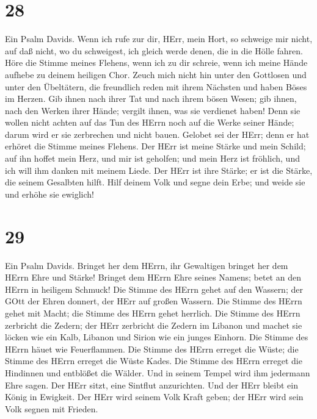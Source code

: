 \hypertarget{section-27}{%
\section{28}\label{section-27}}

 Ein Psalm Davids. Wenn ich rufe zur dir, HErr, mein Hort,
so schweige mir nicht, auf daß nicht, wo du schweigest, ich gleich werde
denen, die in die Hölle fahren.  Höre die Stimme meines
Flehens, wenn ich zu dir schreie, wenn ich meine Hände aufhebe zu deinem
heiligen Chor.  Zeuch mich nicht hin unter den Gottlosen und
unter den Übeltätern, die freundlich reden mit ihrem Nächsten und haben
Böses im Herzen.  Gib ihnen nach ihrer Tat und nach ihrem
bösen Wesen; gib ihnen, nach den Werken ihrer Hände; vergilt ihnen, was
sie verdienet haben!  Denn sie wollen nicht achten auf das
Tun des HErrn noch auf die Werke seiner Hände; darum wird er sie
zerbrechen und nicht bauen.  Gelobet sei der HErr; denn er
hat erhöret die Stimme meines Flehens.  Der HErr ist meine
Stärke und mein Schild; auf ihn hoffet mein Herz, und mir ist geholfen;
und mein Herz ist fröhlich, und ich will ihm danken mit meinem Liede.
 Der HErr ist ihre Stärke; er ist die Stärke, die seinem
Gesalbten hilft.  Hilf deinem Volk und segne dein Erbe; und
weide sie und erhöhe sie ewiglich!

\hypertarget{section-28}{%
\section{29}\label{section-28}}

 Ein Psalm Davids. Bringet her dem HErrn, ihr Gewaltigen
bringet her dem HErrn Ehre und Stärke!  Bringet dem HErrn
Ehre seines Namens; betet an den HErrn in heiligem Schmuck! 
Die Stimme des HErrn gehet auf den Wassern; der GOtt der Ehren donnert,
der HErr auf großen Wassern.  Die Stimme des HErrn gehet mit
Macht; die Stimme des HErrn gehet herrlich.  Die Stimme des
HErrn zerbricht die Zedern; der HErr zerbricht die Zedern im Libanon
 und machet sie löcken wie ein Kalb, Libanon und Sirion wie
ein junges Einhorn.  Die Stimme des HErrn häuet wie
Feuerflammen.  Die Stimme des HErrn erreget die Wüste; die
Stimme des HErrn erreget die Wüste Kades.  Die Stimme des
HErrn erreget die Hindinnen und entblößet die Wälder. Und in seinem
Tempel wird ihm jedermann Ehre sagen.  Der HErr sitzt, eine
Sintflut anzurichten. Und der HErr bleibt ein König in Ewigkeit.
 Der HErr wird seinem Volk Kraft geben; der HErr wird sein
Volk segnen mit Frieden.

